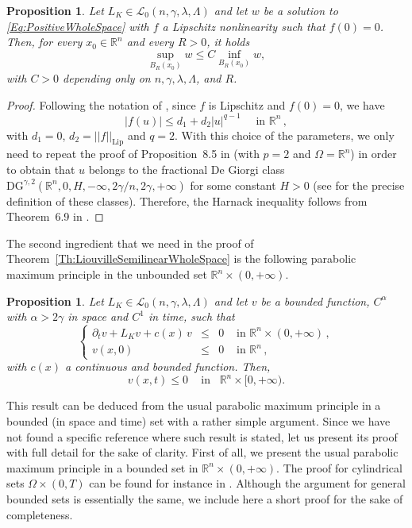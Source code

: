 \documentclass[12pt,reqno]{amsart}
\newtheorem{proposition}[theorem]{Proposition}
\theoremstyle{definition}
\theoremstyle{remark}
\newcommand{\con}[1]{\mathbb{#1}}
\newcommand{\R}{\con{R}} %
\newcommand{\lcal}{\mathcal{L}}
\newcommand{\s}{\gamma}
\newcommand\beqc[1]{\left\{\begin{array}{#1}}
\newcommand\eeqc{\end{array} \right.}
\def\PDEsystem{rcll}
\numberwithin{equation}{section}
\begin{document}
\begin{proposition}
	\label{Prop:HarnackSemilinear}
	Let $L_K\in\mathcal{L}_0(n,\s,\lambda,\Lambda)$ and let $w$ be a solution to \eqref{Eq:PositiveWholeSpace} with $f$ a Lipschitz nonlinearity such that $f(0) = 0$. Then, for every $x_0 \in \R^n$ and every $R>0$, it holds
	$$
	\sup_{B_R(x_0)} w \leq C  \inf_{B_R(x_0)} w, 
	$$
	with $C>0$  depending only on $n,\s,\lambda,\Lambda$, and $R$.
\end{proposition}

\begin{proof}
	Following the notation of \cite{Cozzi-DeGiorgiClassesLong}, since $f$ is Lipschitz and $f(0) = 0$, we have
	$$
	|f(u)|\leq d_1 + d_2 |u|^{q-1} \quad \text{ in } \R^n\,,
	$$ 
	with $d_1=0$, $d_2 =||f||_{\mathrm{Lip}}$ and $q=2$. With this choice of the parameters, we only need to repeat the proof of Proposition~8.5 in \cite{Cozzi-DeGiorgiClassesLong} (with $p=2$ and $\Omega = \R^n$) in order to obtain that $u$ belongs to the fractional De Giorgi class $\mathrm{DG}^{\s,2} ( \R^n , 0, H, -\infty,2\s/n,2\s,+\infty)$	for some constant $H>0$ (see \cite{Cozzi-DeGiorgiClassesLong} for the precise definition of these classes). Therefore, the Harnack inequality follows from Theorem~6.9 in \cite{Cozzi-DeGiorgiClassesLong}.
\end{proof}


The second ingredient that we need in the proof of Theorem~\ref{Th:LiouvilleSemilinearWholeSpace} is the following parabolic maximum principle in the unbounded set $\R^n \times (0,+\infty)$. 

\begin{proposition}
	\label{Prop:ParaMaxPrp}
	Let $L_K \in \lcal_0(n,\s,\lambda, \Lambda)$ and let $v$ be a bounded function, $C^\alpha$ with $\alpha > 2\s$ in space and $C^1$ in time, such that
	\begin{equation*}
	\beqc{\PDEsystem}
	\partial_t v + L_K  v + c(x)\,v &\leq& 0 & \textrm{ in }\R^n\times(0,+\infty)\,,\\
	v(x,0) &\leq& 0 & \textrm{ in } \R^n\,,
	\eeqc
	\end{equation*}
	with $c(x)$ a continuous and bounded function. Then,
	$$ v(x,t) \leq 0 \,\,\,\,\,\text{ in } \,\,\, \R^n\times[0,+\infty). $$
\end{proposition}

This result can be deduced from the usual parabolic maximum principle in a bounded (in space and time) set with a rather simple argument. Since we have not found a specific reference where such result is stated, let us present its proof with full detail for the sake of clarity. First of all, we present the usual parabolic maximum principle in a bounded set in $\R^n \times (0,+\infty)$. The proof for cylindrical sets $\Omega \times (0,T)$ can be found for instance in \cite{BarriosPeralSoriaValdinoci}. Although the argument for general bounded sets is essentially the same,  we include here a short proof for the sake of completeness.
\end{document}
